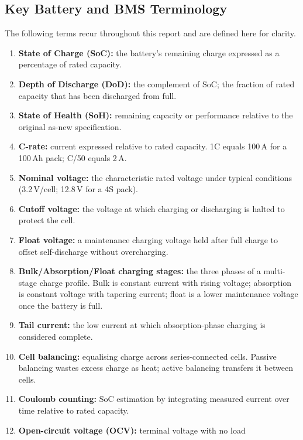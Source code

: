 \documentclass[12pt, a4paper]{report}
\begin{document}
{\subsection{Key Battery and BMS Terminology}

The following terms recur throughout this report and are defined here for
clarity.

\begin{enumerate}[label=\Alph*., leftmargin=0.7in, noitemsep]
  \item \textbf{State of Charge (SoC):} the battery's remaining charge
        expressed as a percentage of rated capacity.
  \item \textbf{Depth of Discharge (DoD):} the complement of SoC; the
        fraction of rated capacity that has been discharged from full.
  \item \textbf{State of Health (SoH):} remaining capacity or performance
        relative to the original as-new specification.
  \item \textbf{C-rate:} current expressed relative to rated capacity. 1C
        equals 100\,A for a 100\,Ah pack; C/50 equals 2\,A.
  \item \textbf{Nominal voltage:} the characteristic rated voltage under
        typical conditions (3.2\,V/cell; 12.8\,V for a 4S pack).
  \item \textbf{Cutoff voltage:} the voltage at which charging or
        discharging is halted to protect the cell.
  \item \textbf{Float voltage:} a maintenance charging voltage held after
        full charge to offset self-discharge without overcharging.
  \item \textbf{Bulk/Absorption/Float charging stages:} the three phases
        of a multi-stage charge profile. Bulk is constant current with
        rising voltage; absorption is constant voltage with tapering current;
        float is a lower maintenance voltage once the battery is full.
  \item \textbf{Tail current:} the low current at which absorption-phase
        charging is considered complete.
  \item \textbf{Cell balancing:} equalising charge across series-connected
        cells. Passive balancing wastes excess charge as heat; active
        balancing transfers it between cells.
  \item \textbf{Coulomb counting:} SoC estimation by integrating measured
        current over time relative to rated capacity.
  \item \textbf{Open-circuit voltage (OCV):} terminal voltage with no load

\end{enumerate}}
\end{document}
